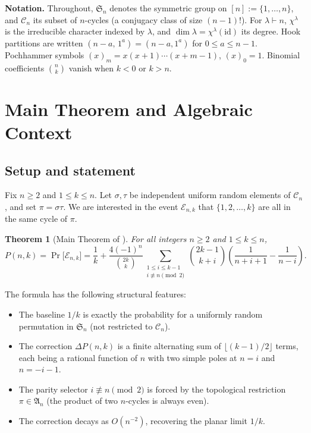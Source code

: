\documentclass[12pt, a4paper]{amsart}
\theoremstyle{plain}
\newtheorem{theorem}{Theorem}[section]
\theoremstyle{definition}
\theoremstyle{remark}
\newcommand{\C}{\mathcal{C}}
\newcommand{\Sn}{\mathfrak{S}_n}
\newcommand{\An}{\mathfrak{A}_n}
\newcommand{\hook}[2]{(#1\!-\!#2,\,1^{#2})}
\newcommand{\deltap}{\Delta P(n,k)}
\begin{document}
\medskip
\noindent\textbf{Notation.}  Throughout, $\Sn$ denotes the symmetric group on
$[n]:=\{1,\dots,n\}$, and $\C_n$ its subset of $n$-cycles (a conjugacy class of
size $(n-1)!$).  For $\lambda\vdash n$, $\chi^\lambda$ is the irreducible character
indexed by $\lambda$, and $\dim\lambda = \chi^\lambda(\mathrm{id})$ its degree.
Hook partitions are written $\hook{n}{a} = (n-a,1^a)$ for $0\le a\le n-1$.
Pochhammer symbols $(x)_m = x(x+1)\cdots(x+m-1)$, $(x)_0=1$.
Binomial coefficients $\binom{n}{k}$ vanish when $k<0$ or $k>n$.

\section{Main Theorem and Algebraic Context}
\label{sec:theorem}

\subsection{Setup and statement}

Fix $n\ge 2$ and $1\le k\le n$.  Let $\sigma,\tau$ be independent uniform random
elements of $\C_n$, and set $\pi = \sigma\tau$.  We are interested in the event
$\mathcal{E}_{n,k}$ that $\{1,2,\dots,k\}$ are all in the same cycle of $\pi$.

\begin{theorem}[Main Theorem of {\normalfont[MS]}]\label{thm:main}
For all integers $n\ge 2$ and $1\le k\le n$,
\begin{equation}\label{eq:main}
  P(n,k)
  = \Pr\!\bigl[\mathcal{E}_{n,k}\bigr]
  = \frac{1}{k}
  + \frac{4(-1)^n}{\binom{2k}{k}}
    \sum_{\substack{1\le i\le k-1\\i\not\equiv n\pmod{2}}}
    \binom{2k-1}{k+i}
    \left(\frac{1}{n+i+1}-\frac{1}{n-i}\right).
\end{equation}
\end{theorem}

The formula has the following structural features:
\begin{itemize}
  \item The baseline $1/k$ is exactly the probability for a uniformly random
        permutation in $\Sn$ (not restricted to $\C_n$).
  \item The correction $\deltap$ is a finite alternating sum of $\lfloor(k-1)/2\rfloor$
        terms, each being a rational function of $n$ with two simple poles at
        $n=i$ and $n=-i-1$.
  \item The parity selector $i\not\equiv n\pmod 2$ is forced by the topological
        restriction $\pi\in\An$ (the product of two $n$-cycles is always even).
  \item The correction decays as $O(n^{-2})$, recovering the planar limit $1/k$.
\end{itemize}
\end{document}
